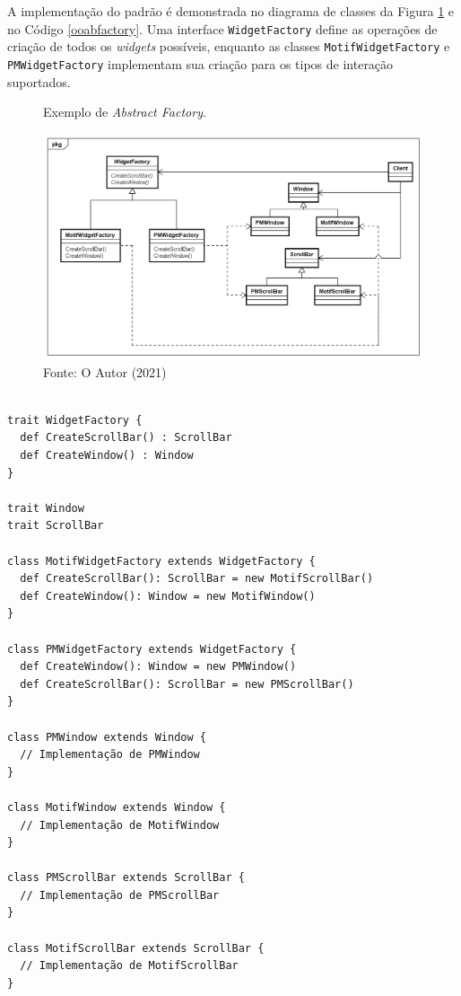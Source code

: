 A implementação do padrão é demonstrada no 
diagrama de classes da Figura \ref{abfactory_exemplo} 
e no Código \ref{ooabfactory}. Uma interface 
\texttt{WidgetFactory} define as operações de criação 
de todos os \textit{widgets} possíveis, enquanto 
as classes \texttt{MotifWidgetFactory} e \texttt{PMWidgetFactory} 
implementam sua criação para os tipos de 
interação suportados.

\begin{figure}[htb]
	\caption{\label{abfactory_exemplo}Exemplo de \textit{Abstract Factory}.}
	\begin{center}
	    \includegraphics[scale=0.5]{5_padroes-contexto-funcional/5.1_criacionais/5.1.2_abstract-factory/abstractfactory_exemplo.png}
	\end{center}
  \caption*{Fonte: O Autor (2021)}
\end{figure}

\begin{lstlisting}[caption={\textit{Abstract Factory} Orientado a Objetos.},label=ooabfactory]
	
trait WidgetFactory {
  def CreateScrollBar() : ScrollBar
  def CreateWindow() : Window
}

trait Window 
trait ScrollBar

class MotifWidgetFactory extends WidgetFactory {
  def CreateScrollBar(): ScrollBar = new MotifScrollBar()
  def CreateWindow(): Window = new MotifWindow()
}

class PMWidgetFactory extends WidgetFactory {
  def CreateWindow(): Window = new PMWindow()
  def CreateScrollBar(): ScrollBar = new PMScrollBar()
}

class PMWindow extends Window {
  // Implementação de PMWindow
}

class MotifWindow extends Window {
  // Implementação de MotifWindow
}

class PMScrollBar extends ScrollBar {
  // Implementação de PMScrollBar
}

class MotifScrollBar extends ScrollBar {
  // Implementação de MotifScrollBar
}

\end{lstlisting}


